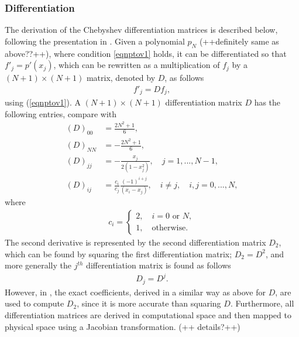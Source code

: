 \documentclass[11pt, a4paper]{article}
\theoremstyle{definition}
\begin{document}
\subsubsection{Differentiation}
The derivation of the Chebyshev differentiation matrices is described below, following the presentation in \cite{bibTrefethen}. Given a polynomial $p_N$ (++definitely same as above??++), where condition \eqref{eqnptov1} holds, it can be differentiated so that $f'_j = p'(x_j)$, which can be rewritten as a multiplication of $f_j$ by a $(N+1) \times (N+1)$ matrix, denoted by $D$, as follows
\begin{align*}
	f'_j= D f_j,
\end{align*}
using (\ref{eqnptov1}).
A $(N+1) \times (N+1)$ differentiation matrix $D$ has the following entries, compare with \cite{bibTrefethen}
\begin{align*}
	(D)_{00}&= \frac{2N^2 +1}{6},\\
	(D)_{NN}&= -\frac{2N^2 +1}{6},\\
	(D)_{jj}&= -\frac{x_j}{2(1-x_j^2)}, \quad j=1,...,N-1,\\
	(D)_{ij}&= \frac{c_i}{c_j} \frac{(-1)^{i+j}}{(x_i-x_j)}, \quad i \neq j, \quad i,j=0,...,N,
\end{align*} 	
where 
\begin{align*}
	c_i =\left\{\begin{array}{l} 2, \quad i=0 \text{   or   }N, \\1, \quad \text{otherwise.}\end{array}\right.
\end{align*}	
The second derivative is represented by the second differentiation matrix $D_2$, which can be found by squaring the first differentiation matrix; $D_2=D^2$, and more generally the $j^{th}$ differentiation matrix is found as follows
\begin{align*}
	D_j=D^j.
\end{align*}
However, in \cite{GoddardPseudospectralCode1}, the exact coefficients, derived in a similar way as above for $D$, are used to compute $D_2$, since it is more accurate than squaring $D$. Furthermore, all differentiation matrices are derived in computational space and then mapped to physical space using a Jacobian transformation. (++ details?++)
\end{document}
